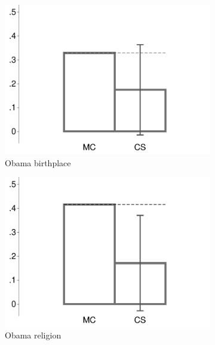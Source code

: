 \begin{figure}[t]
	\caption{Confidence Scoring vs. IDA (MTurk 1)}	
	\centering
	\begin{subfigure}{.325\textwidth}\centering
		\includegraphics[width=\textwidth]{../figs/confidence_score_ccd_ida_ips_birth_study1.pdf}
		\caption{Obama birthplace}
	\end{subfigure}
	\hfill
	\begin{subfigure}{.325\textwidth}\centering
		\includegraphics[width=\textwidth]{../figs/confidence_score_ccd_ida_ips_religion_study1.pdf}
		\caption{Obama religion}
	\end{subfigure}	
	\hfill
	\begin{subfigure}{.325\textwidth}\centering

\end{subfigure}
\end{figure}
